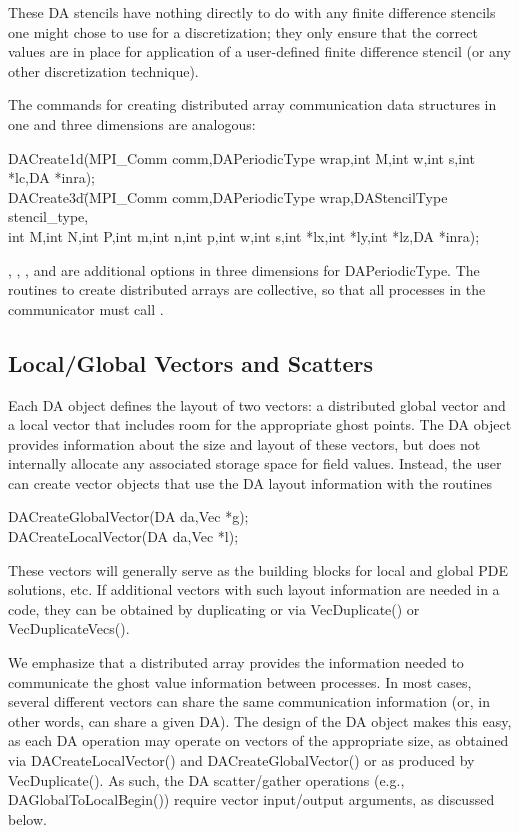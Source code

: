 These DA stencils have nothing directly to do with any finite
difference stencils one might chose to use for a discretization; they
only ensure that the correct values are in place for application of a
user-defined finite difference stencil (or any other
discretization technique).

The commands for creating distributed array communication data structures
in one and three dimensions are analogous:
\begin{tabbing}
  DACreate1d(MPI\_Comm comm,DAPeriodicType wrap,int M,int w,int s,int *lc,DA *inra);\\
  DACreate3d\=(MPI\_Comm comm,DAPeriodicType wrap,DAStencilType stencil\_type,\\
             \>int M,int N,int P,int m,int n,int p,int w,int s,int *lx,int *ly,int *lz,DA *inra);
\end{tabbing}
, 
, 
, and 
 
are additional options in three dimensions for DAPeriodicType.
The routines to create distributed arrays are collective, so that all
processes in the communicator  must call .

\subsection{Local/Global Vectors and Scatters}

Each DA object defines the layout of two vectors: a distributed
global vector and a local vector that includes room for the
appropriate ghost points.  The DA object provides information
about the size and layout of these vectors, but does not internally
allocate any associated storage space for field values.  Instead, the
user can create vector objects that use the DA layout
information with the routines
\begin{tabbing}
  DACreateGlobalVector(DA da,Vec *g);\\
  DACreateLocalVector(DA da,Vec *l);
\end{tabbing}
These vectors will generally serve as the building blocks for local
and global PDE solutions, etc.  If additional vectors with such
layout information are needed in a code, they can be obtained by
duplicating  or  via
VecDuplicate() or VecDuplicateVecs().

We emphasize that a distributed array provides the information needed
to communicate the ghost value information between processes.  In most
cases, several different vectors can share the same communication
information (or, in other words, can share a given DA).  The
design of the DA object makes this easy, as each DA
operation may operate on vectors of the appropriate size, as obtained
via DACreateLocalVector() and DACreateGlobalVector() or as
produced by VecDuplicate().  As such, the DA
scatter/gather operations (e.g., DAGlobalToLocalBegin()) require
vector input/output arguments, as discussed below.

